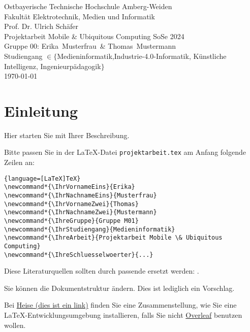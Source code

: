 \documentclass[12pt,oneside]{article}
\newcommand*{\IhrVornameEins}{Erika}
\newcommand*{\IhrNachnameEins}{Musterfrau}
\newcommand*{\IhrVornameZwei}{Thomas}
\newcommand*{\IhrNachnameZwei}{Mustermann}
\newcommand*{\IhreGruppe}{Gruppe 00}
\newcommand*{\IhrStudiengang}{$\in \{$Medieninformatik,Industrie-4.0-Informatik, Künstliche Intelligenz, Ingenieurpädagogik$\}$}
\newcommand*{\IhreArbeit}{Projektarbeit Mobile \& Ubiquitous Computing SoSe 2024}
\newcommand*{\IhreSchluesselwoerter}{Android, ESP32, MQTT, IoT, Pulsoximeter, MAX30100, WLAN}
\newcommand*{\IhrErstpruefer}{Prof. Dr. Ulrich Schäfer}
\begin{document}
  \thispagestyle{empty}
  \originalTeX
  \begin{center}
 	\Large
 	Ostbayerische Technische Hochschule Amberg-Weiden\\
 Fakultät Elektrotechnik, Medien und Informatik\\[.8cm]
 \large \IhrErstpruefer\\[.8cm]
 \Large \IhreArbeit\\[.8cm]
 \large \IhreGruppe: \IhrVornameEins\ \IhrNachnameEins\ \&
 \IhrVornameZwei\ \IhrNachnameZwei\\[.8cm]
 \large Studiengang \IhrStudiengang\\[.8cm]
 \today\\[2.5cm]
  \end{center}
  
  \tableofcontents

  \clearpage
  
  
  \section{Einleitung}
  
  Hier starten Sie mit Ihrer Beschreibung.
  
  Bitte passen Sie in der \LaTeX-Datei \texttt{projektarbeit.tex} am Anfang folgende 
  Zeilen an:
  
\begin{lstlisting}{language=[LaTeX]TeX}
\newcommand*{\IhrVornameEins}{Erika}
\newcommand*{\IhrNachnameEins}{Musterfrau}
\newcommand*{\IhrVornameZwei}{Thomas}
\newcommand*{\IhrNachnameZwei}{Mustermann}
\newcommand*{\IhreGruppe}{Gruppe M01}
\newcommand*{\IhrStudiengang}{Medieninformatik}
\newcommand*{\IhreArbeit}{Projektarbeit Mobile \& Ubiquitous Computing}
\newcommand*{\IhreSchluesselwoerter}{...}
\end{lstlisting}
  
  Diese Literaturquellen sollten durch passende ersetzt werden: \cite{Breymann:2020,jabref,Schaefer_Spurk:2010,ct_LaTeX:2005,zotero}.
  
  Sie können die Dokumentstruktur ändern. Dies ist lediglich ein Vorschlag.
  
  Bei \href{https://www.heise.de/download/blog/Einfuehrung-in-LaTeX-3599742}{Heise (dies ist ein link)} finden Sie 
  eine Zusammenstellung, wie Sie eine \LaTeX-Entwicklungsumgebung installieren, falls Sie nicht
  \href{https://www.overleaf.com}{Overleaf} benutzen wollen.
\end{document}
